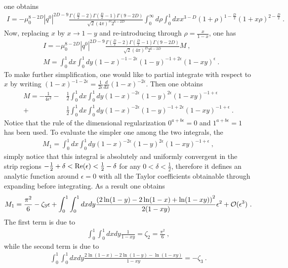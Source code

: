\documentclass[a4paper,11pt]{article}
\begin{document}
one obtains
\begin{align}
I=-\mu_0^{8-2D}|q^0|^{2D-9}\frac{\Gamma(\frac{D}{2}-2)\Gamma(\frac{D}{2}-1)\Gamma(9-2D)}{\sqrt{2}(4\pi)^D2^{6-2D}}\int_{0}^{\infty} d\rho\int_{0}^1 dx x^{3-D}(1+\rho)^{1-\frac{D}{2}}(1+x\rho)^{2-\frac{D}{2}} \ .
\end{align}
Now, replacing  $x$ by $x\rightarrow 1-y$ and re-introducing through $\rho=\frac{x}{1-x}$, one has
\begin{align}
&I=-\mu_0^{8-2D}|q^0|^{2D-9}\frac{\Gamma(\frac{D}{2}-2)\Gamma(\frac{D}{2}-1)\Gamma(9-2D)}{\sqrt{2}(4\pi)^D2^{6-2D}}M \ , \\
&M=\int_{0}^{1} dx \int_{0}^1dy (1-x)^{-1-2\epsilon}(1-y)^{-1+2\epsilon}(1-xy)^{\epsilon} \ .
\end{align}
To make further simplification, one would like to partial integrate with respect to $x$ by writing $(1-x)^{-1-2\epsilon}=\frac{1}{2\epsilon}\frac{d}{dx}(1-x)^{-2\epsilon}$. Then one obtains
\begin{align}
M=-\frac{1}{4\epsilon^2}-&\frac{1}{2}\int_{0}^1 dx\int_{0}^1 dy(1-x)^{-2\epsilon}(1-y)^{2\epsilon}(1-xy)^{-1+\epsilon}\nonumber \\ 
+&\frac{1}{2}\int_{0}^1 dx\int_{0}^1 dy(1-x)^{-2\epsilon}(1-y)^{-1+2\epsilon}(1-xy)^{-1+\epsilon} \ .
\end{align}
Notice that the rule of the dimensional regularization $0^{a+b\epsilon}=0$ and $1^{a+b\epsilon}=1$ has been used. To evaluate the simpler one among the two integrals, the
\begin{align}
 M_1=\int_{0}^1 dx\int_{0}^1 dy(1-x)^{-2\epsilon}(1-y)^{2\epsilon}(1-xy)^{-1+\epsilon} \ ,
\end{align}
simply notice that this integral is absolutely and uniformly convergent in the strip regions $-\frac{1}{2}+\delta<{\rm Re} (\epsilon)<\frac{1}{2}-\delta$ for any $0<\delta<\frac{1}{2}$, therefore it defines an analytic function around $\epsilon=0$ with all the Taylor coefficients obtainable through expanding before integrating. As a result one obtains
\begin{align}
 M_1=\frac{\pi^2}{6}-\zeta_3\epsilon+\int_{0}^1\int_{0}^{1} dxdy\frac{\left(2\ln(1-y)-2\ln(1-x)+\ln(1-xy)\right)^2}{2(1- x y)}\epsilon^2 +{\cal O}(\epsilon^3)\ .
\end{align}
The first term is due to 
\begin{align}
\int_{0}^{1}\int_{0}^1 dxdy\frac{1}{1-xy}=\zeta_2=\frac{\pi^2}{6} \ ,
\end{align}
while the second term is due to
\begin{align}
\int_{0}^{1}\int_{0}^1 dxdy\frac{2\ln(1-x)-2\ln(1-y)-\ln (1-xy)}{1-xy}=-\zeta_3 \ .
\end{align}
\end{document}
